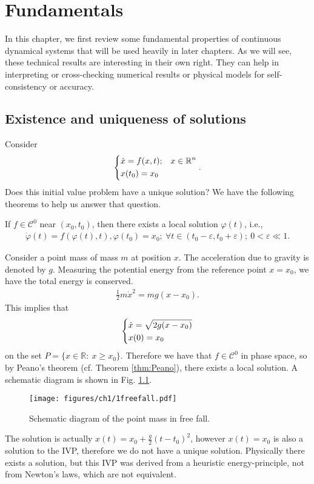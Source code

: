 \chapter{Fundamentals}
 In this chapter, we first review some fundamental properties of continuous dynamical systems that will be used heavily in later chapters. As we will see, these technical results are interesting in their own right. They can help in interpreting or cross-checking numerical results or physical models for self-consistency or accuracy.
\section{Existence and uniqueness of solutions}
Consider  
\begin{align}
\label{eq:ivp1}
\begin{dcases}
	\dot{ {x}} = f( {x},t); &  {x} \in \mathbb{R}^{n} \\
	 {x}(t_0) =  {x}_0
\end{dcases}.
\end{align}
Does this initial value problem have a unique solution? We have the following theorems to help us answer that question.
\begin{theorem}[Peano]
	\label{thm:Peano}
	If $f\in \mathcal{C}^0$ near $( {x}_0, t_0)$, then there exists a local solution $\varphi(t)$, i.e., 
\begin{align}
	\dot{\varphi}(t) = f(\varphi(t), t), \varphi(t_0) = x_0;\ \forall  t\in (t_0 - \varepsilon, t_0 + \varepsilon);\ 0<  \varepsilon \ll 1.
\end{align}
\end{theorem}
\begin{ex}
	Consider a point mass of mass $m$ at position $x$. The acceleration due to gravity is denoted by $g$. Measuring the potential energy from the reference point $x=x_0$, we have the total energy is conserved.
	\begin{align}
		\frac{1}{2} m \dot{x}^2 = mg(x-x_0).
	\end{align}
This implies that
\begin{align}
	\begin{dcases}
		\dot{x} = \sqrt{2g(x-x_0)} \\
		x(0) = x_0
	\end{dcases}
\end{align}
on the set $P = \{ x \in \mathbb{R}:\ x \geq x_0\}$. Therefore we have that $f\in \mathcal{C}^0$ in phase space, so by Peano's theorem (cf. Theorem \ref{thm:Peano}), there exists a local solution. A schematic diagram is shown in Fig. \ref{fig:point_mass}. 
	\begin{figure}[h!]
		\centering
		\texttt{[image: figures/ch1/1freefall.pdf]}
		\caption{Schematic diagram of the point mass in free fall.}
		\label{fig:point_mass}
	\end{figure}
	The solution is actually $x(t) = x_0 + \frac{g}{2}(t-t_0)^2$, however $x(t) = x_0$ is also a solution to the IVP, therefore we do not have a unique solution. Physically there exists a solution, but this IVP was derived from a heuristic energy-principle, not from Newton's laws, which are not equivalent.
\end{ex}
